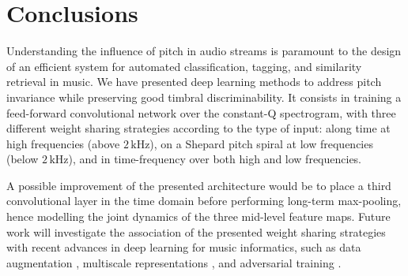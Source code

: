 \documentclass{article}
\begin{document}
\section{Conclusions}
Understanding the influence of pitch in audio streams is paramount to the design of
an efficient system for automated classification, tagging, and similarity retrieval in music.
We have presented deep learning methods to address pitch invariance
while preserving good timbral discriminability.
It consists in training a feed-forward convolutional network over the constant-Q spectrogram,
with three different weight sharing strategies according to the type of input:
along time at high frequencies (above $2\,\mathrm{kHz}$),
on a Shepard pitch spiral at low frequencies (below $2\,\mathrm{kHz}$),
and in time-frequency over both high and low frequencies.

A possible improvement of the presented architecture would be to
place a third convolutional layer in the time domain before performing long-term
max-pooling, hence modelling the joint dynamics of the three mid-level feature maps.
Future work will investigate the association of the presented weight sharing strategies
with recent advances in deep learning for music informatics,
such as data augmentation \cite{McFee2015-muda},
multiscale representations \cite{Hamel2012, Anden2015},
and adversarial training \cite{Kereliuk2015}.


\end{document}
